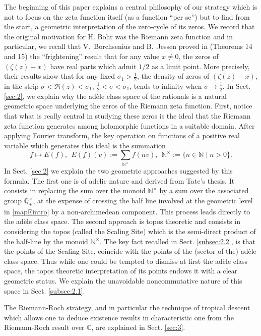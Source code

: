 \documentclass[graybox, envcountsect%
]{svmult}
\def\C{{\mathbb C}}
\def\N{{\mathbb N}}
\def\Q{{\mathbb Q}}
\def\nt{\N^{\times}}
\begin{document}
The beginning of this paper explains a central philosophy of our strategy which is not to focus on the zeta function itself (as a function ``per se'') but to find from the start, a geometric interpretation of the zero-cycle of its zeros. We record that the original motivation for H. Bohr was the Riemann zeta function and in particular, we recall that V.~Borchsenius and B.~Jessen proved in  \cite{BJ} (Theorems 14 and 15) the ``frightening'' result that for any value $x\neq 0$, the zeros of $(\zeta(z)-x)$ have real parts which admit $1/2$ as a limit point. More precisely, their results show that for any fixed $\sigma_1>\frac 12$, the density of zeros of $(\zeta(z)-x)$, in the strip $\sigma<\Re(z) <\sigma_1$, $\frac 12<\sigma<\sigma_1$, tends to infinity when $\sigma\to \frac 12$.\newline
 In Sect.  \ref{sec:2}, we explain why the ad\`ele class space of the rationals is a natural geometric space underlying the zeros of the Riemann zeta function. First, notice that what is really central in studying these zeros  is the ideal that the Riemann zeta function generates among holomorphic functions in a suitable domain. After applying Fourier transform, the key operation on functions of a positive real variable which generates this ideal is the summation 
\begin{equation}\label{mapEintro}
	f \mapsto E(f), \ \ E(f)(v):=\sum_{\nt} f(nv), \ \ \nt:=\{n\in \N\mid n>0\}.
\end{equation}
In Sect.  \ref{sec:2} we explain the two geometric approaches suggested by this formula. The first one is of adelic nature and derived from Tate's thesis. It consists in replacing the sum over the monoid $\nt$ by a sum over the associated group $\Q_+^\times$, at the expense of crossing the half line involved at the geometric level in \eqref{mapEintro} by a non-archimedean component. This process leads directly to the ad\`ele class space. The second approach is topos theoretic and consists in considering the topos (called the Scaling Site) which is the semi-direct product of the half-line by the  monoid $\nt$. The key fact recalled in Sect.  \ref{subsec:2.2}, is that the points  of the Scaling Site, coincide with the points of the (sector of the) ad\`ele class space. Thus while one could be tempted to dismiss at first the ad\`ele class space, the topos theoretic interpretation of its points endows it with a clear geometric status. 
We explain the unavoidable noncommutative nature of this space in Sect.  \ref{subsec:2.1}.


The Riemann-Roch strategy, and in particular the technique of tropical descent which allows one to deduce existence results in characteristic one from the Riemann-Roch result over $\C$, are explained in Sect.  \ref{sec:3}.
\end{document}
